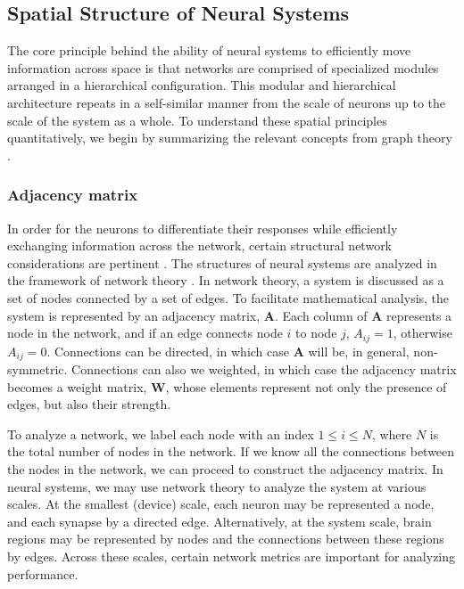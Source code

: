 \documentclass[twocolumn]{article}
\begin{document}
\subsection{Spatial Structure of Neural Systems}
The core principle behind the ability of neural systems to efficiently move information across space is that networks are comprised of specialized modules arranged in a hierarchical configuration. This modular and hierarchical architecture repeats in a self-similar manner from the scale of neurons up to the scale of the system as a whole. To understand these spatial principles quantitatively, we begin by summarizing the relevant concepts from graph theory \cite{eskn2015}.

\subsubsection{Adjacency matrix}
In order for the neurons to differentiate their responses while efficiently exchanging information across the network, certain structural network considerations are pertinent \cite{rusp2010}. The structures of neural systems are analyzed in the framework of network theory \cite{eskn2015}. In network theory, a system is discussed as a set of nodes connected by a set of edges. To facilitate mathematical analysis, the system is represented by an adjacency matrix, $\mathbf{A}$. Each column of $\mathbf{A}$ represents a node in the network, and if an edge connects node $i$ to node $j$, $A_{ij} = 1$, otherwise $A_{ij} = 0$. Connections can be directed, in which case $\mathbf{A}$ will be, in general, non-symmetric. Connections can also we weighted, in which case the adjacency matrix becomes a weight matrix, $\mathbf{W}$, whose elements represent not only the presence of edges, but also their strength.

To analyze a network, we label each node with an index $1\le i\le N$, where $N$ is the total number of nodes in the network. If we know all the connections between the nodes in the network, we can proceed to construct the adjacency matrix. In neural systems, we may use network theory to analyze the system at various scales. At the smallest (device) scale, each neuron may be represented a node, and each synapse by a directed edge. Alternatively, at the system scale, brain regions may be represented by nodes and the connections between these regions by edges. Across these scales, certain network metrics are important for analyzing performance. 
\end{document}
